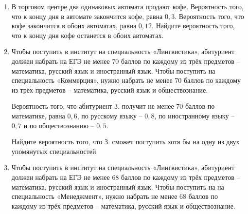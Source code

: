 \documentclass[12pt, a4paper]{article}
\begin{document}
\begin{enumerate}
		\item В торговом центре два одинаковых автомата продают кофе. Вероятность того, что к концу дня в автомате закончится кофе, равна \( 0,3 \). Вероятность того, что кофе закончится в обоих автоматах, равна \( 0,12 \). Найдите вероятность того, что к концу дня кофе останется в обоих автоматах.
		\item Чтобы поступить в институт на специальность «Лингвистика», абитуриент должен набрать на ЕГЭ не менее \( 70 \) баллов по каждому из трёх предметов – математика, русский язык и иностранный язык. Чтобы поступить на специальность «Коммерция», нужно набрать не менее \( 70 \) баллов по каждому из трёх предметов – математика, русский язык и обществознание.
		
		Вероятность того, что абитуриент З. получит не менее \( 70 \) баллов по математике, равна \( 0,6 \), по русскому языку – \( 0,8 \), по иностранному языку – \( 0,7 \) и по обществознанию – \( 0,5 \).
		
		Найдите вероятность того, что З. сможет поступить хотя бы на одну из двух упомянутых специальностей.
		\item Чтобы поступить в институт на специальность «Лингвистика», абитуриент должен набрать на ЕГЭ не менее \( 68 \) баллов по каждому из трёх предметов – математика, русский язык и иностранный язык. Чтобы поступить на на специальность «Менеджмент», нужно набрать не менее \( 68 \) баллов по каждому из трёх предметов – математика, русский язык и обществознание.
		

\end{enumerate}
\end{document}
